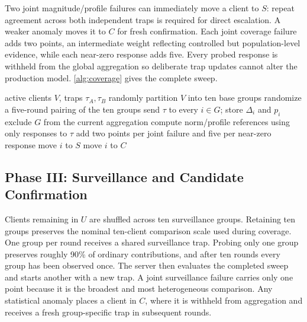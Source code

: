 \documentclass[conference]{IEEEtran}
\begin{document}
Two joint magnitude/profile failures can immediately move a client to $S$: repeat agreement across both independent traps is required for direct escalation. A weaker anomaly moves it to $C$ for fresh confirmation. Each joint coverage failure adds two points, an intermediate weight reflecting controlled but population-level evidence, while each near-zero response adds five. Every probed response is withheld from the global aggregation so deliberate trap updates cannot alter the production model. \autoref{alg:coverage} gives the complete sweep.

\begin{algorithm}[t]
\caption{Phase II: double coverage sweep}
\label{alg:coverage}
\begin{algorithmic}[1]
\Require active clients $V$, traps $\tau_A,\tau_B$
\State randomly partition $V$ into ten base groups
 \State randomize a five-round pairing of the ten groups
   \State send $\tau$ to every $i\in G$; store $\Delta_i$ and $p_i$
   \State exclude $G$ from the current aggregation
 \EndFor
 \State compute norm/profile references using only responses to $\tau$
\EndFor
{}
 \State add two points per joint failure and five per near-zero response
  \State move $i$ to $S$
  \State move $i$ to $C$
 \EndIf
\EndFor
\end{algorithmic}
\end{algorithm}

\subsection{Phase III: Surveillance and Candidate Confirmation}
Clients remaining in $U$ are shuffled across ten surveillance groups. Retaining ten groups preserves the nominal ten-client comparison scale used during coverage. One group per round receives a shared surveillance trap. Probing only one group preserves roughly 90\% of ordinary contributions, and after ten rounds every group has been observed once. The server then evaluates the completed sweep and starts another with a new trap. A joint surveillance failure carries only one point because it is the broadest and most heterogeneous comparison. Any statistical anomaly places a client in $C$, where it is withheld from aggregation and receives a fresh group-specific trap in subsequent rounds.
\end{document}

